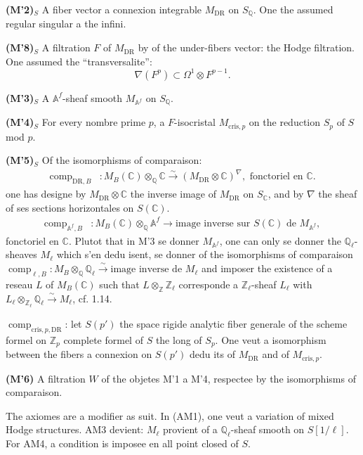 \documentclass[12pt,a4paper]{article}
\theoremstyle{plain}
\theoremstyle{definition}
\theoremstyle{remark}
\providecommand{\DR}{\mathrm{DR}}
\providecommand{\cris}{\mathrm{cris}}
\providecommand{\comp}{\operatorname{comp}}
\begin{document}
\textbf{(M'2)$_S$} A fiber vector a connexion integrable $M_{\DR}$ on
$S_\mathbb{Q}$. One the assumed regular singular a the infini.

\textbf{(M'8)$_S$} A filtration $F$ of $M_{\DR}$ by of the under-fibers vector: the
Hodge filtration. One assumed the ``transversalite'':
\[
\nabla(F^p) \subset \Omega^1 \otimes F^{p-1}.
\]

\textbf{(M'3)$_S$} A $\mathbb{A}^f$-sheaf smooth $M_{\mathbb{A}^f}$ on $S_\mathbb{Q}$.

\textbf{(M'4)$_S$} For every nombre prime $p$, a $F$-isocristal $M_{\cris,p}$ on the
reduction $S_p$ of $S$ mod $p$.

\textbf{(M'5)$_S$} Of the isomorphisms of comparaison:
\begin{align*}
\comp_{\DR,B} &: M_B(\mathbb{C}) \otimes_{\mathbb{Q}} \mathbb{C}
\xrightarrow{\sim} (M_{\DR} \otimes \mathbb{C})^\nabla, \text{ fonctoriel en }
\mathbb{C}.
\end{align*}
one has designe by $M_{\DR} \otimes \mathbb{C}$ the inverse image of $M_{\DR}$ on
$S_\mathbb{C}$, and by $\nabla$ the sheaf of ses sections horizontales on
$S(\mathbb{C})$.
\begin{align*}
\comp_{\mathbb{A}^f,B} &: M_B(\mathbb{C}) \otimes_{\mathbb{Q}} \mathbb{A}^f
\longrightarrow \text{image inverse sur } S(\mathbb{C}) \text{ de }
M_{\mathbb{A}^f},
\end{align*}
fonctoriel en $\mathbb{C}$. Plutot that in M'3 se donner $M_{\mathbb{A}^f}$, one can
only se donner the $\mathbb{Q}_\ell$-sheaves $M_\ell$ which s'en dedu isent, se
donner of the isomorphisms of comparaison $\comp_{\ell,B}: M_B \otimes_{\mathbb{Q}}
\mathbb{Q}_\ell \xrightarrow{\sim} \text{image inverse de } M_\ell$ and imposer the existence
of a reseau $L$ of $M_B(\mathbb{C})$ such that $L \otimes_{\mathbb{Z}} \mathbb{Z}_\ell$
corresponde a $\mathbb{Z}_\ell$-sheaf $L_\ell$ with $L_\ell \otimes_{\mathbb{Z}_\ell}
\mathbb{Q}_\ell \xrightarrow{\sim} M_\ell$, cf. 1.14.

$\comp_{\cris,p,\DR}$: let $S(p')$ the space rigide analytic fiber generale of the
scheme formel on $\mathbb{Z}_p$ complete formel of $S$ the long of $S_p$. One veut a
isomorphism between the fibers a connexion on $S(p')$ dedu its of $M_{\DR}$ and of
$M_{\cris,p}$.

\textbf{(M'6)} A filtration $W$ of the objetes M'1 a M'4, respectee by the
isomorphisms of comparaison.

The axiomes are a modifier as suit. In (AM1), one veut a variation of mixed Hodge structures. AM3 devient: $M_\ell$ provient of a $\mathbb{Q}_\ell$-sheaf smooth on
$S[1/\ell]$. For AM4, a condition is imposee en all point closed of $S$.
\end{document}
